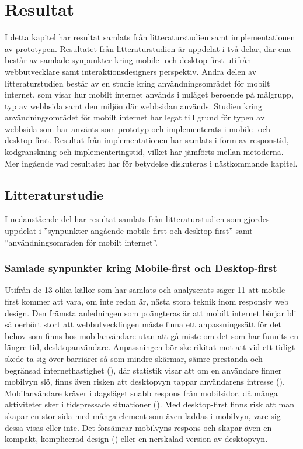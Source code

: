 \documentclass[11pt]{article}
\begin{document}
\newpage

\section{Resultat}

I detta kapitel har resultat samlats från litteraturstudien samt implementationen av prototypen.
Resultatet från litteraturstudien är uppdelat i två delar, där ena består av samlade synpunkter kring mobile- och desktop-first utifrån webbutvecklare samt interaktionsdesigners perspektiv. Andra delen av litteraturstudien består av en studie kring användningsområdet för mobilt internet, som visar hur mobilt internet används i nuläget beroende på målgrupp, typ av webbsida samt den miljön där webbsidan används. Studien kring användningsområdet för mobilt internet har legat till grund för typen av webbsida som har använts som prototyp och implementerats i mobile- och desktop-first. Resultat från implementationen har samlats i form av responstid, kodgranskning och implementeringstid, vilket har jämförts mellan metoderna. Mer ingående vad resultatet har för betydelse diskuteras i nästkommande kapitel.


\subsection{Litteraturstudie}
I nedanstående del har resultat samlats från litteraturstudien som gjordes uppdelat i ''synpunkter angående mobile-first och desktop-first'' samt ''användningsområden för mobilt internet''.
\subsubsection{Samlade synpunkter kring Mobile-first och Desktop-first}
Utifrån de 13 olika källor som har samlats och analyserats säger 11 att mobile-first kommer att vara, om inte redan är, nästa stora teknik inom responsiv web design. Den främsta anledningen som poängteras är att mobilt internet börjar bli så oerhört stort att webbutvecklingen måste finna ett anpassningssätt för det behov som finns hos mobilanvändare utan att gå miste om det som har funnits en längre tid, desktopanvändare. Anpassningen bör ske rikitat mot att vid ett tidigt skede ta sig över barriärer så som mindre skärmar, sämre prestanda och begränsad internethastighet (\cite{themepartner}), där statistik visar att om en användare finner mobilvyn slö, finns även risken att desktopvyn tappar användarens intresse (\cite{zurbword}). Mobilanvändare kräver i dagsläget snabb respons från mobilsidor, då många aktiviteter sker i tidspressade situationer (\cite{techradar}). Med desktop-first finns risk att man skapar en stor sida med många element som även laddas i mobilvyn, vare sig dessa visas eller inte. Det försämrar mobilvyns respons och skapar även en kompakt, komplicerad design (\cite{zurbword}) eller en nerskalad version av desktopvyn.
\end{document}
